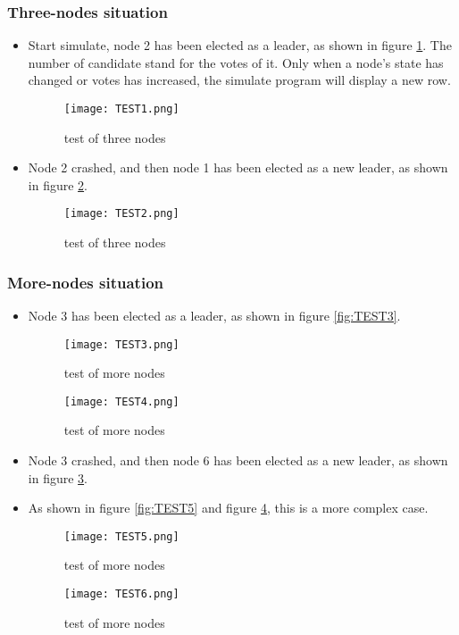 \documentclass{report}
\begin{document}
\subsubsection{Three-nodes situation}
\begin{itemize}
\item Start simulate, node 2 has been elected as a leader, as shown in figure \ref{fig:TEST1}. The number of candidate stand for the votes of it. Only when a node’s state has changed or votes has increased, the simulate program will display a new row.
\begin{figure}[H]
    \centering
    \texttt{[image: TEST1.png]}
    \caption{test of three nodes}
    \label{fig:TEST1}
\end{figure}
\item Node 2 crashed, and then node 1 has been elected as a new leader, as shown in figure \ref{fig:TEST2}.
\begin{figure}[H]
    \centering
    \texttt{[image: TEST2.png]}
    \caption{test of three nodes}
    \label{fig:TEST2}
\end{figure}
\end{itemize}

\subsubsection{More-nodes situation}

\begin{itemize}
\item Node 3 has been elected as a leader, as shown in figure \ref{fig:TEST3}.
\begin{figure}[H]
\begin{minipage}{.45\textwidth}
    \centering
    \texttt{[image: TEST3.png]}
    \caption{test of more nodes}
    \label{fig:TEST3}
\end{minipage}
\begin{minipage}{.45\textwidth}
    \centering
    \texttt{[image: TEST4.png]}
    \caption{test of more nodes}
    \label{fig:TEST4}
\end{minipage}
\end{figure}
\item Node 3 crashed, and then node 6 has been elected as a new leader, as shown in figure \ref{fig:TEST4}.

\item As shown in figure \ref{fig:TEST5} and figure \ref{fig:TEST6}, this is a more complex case. 

\begin{figure}[H]
\begin{minipage}{.45\textwidth}
    \centering
    \texttt{[image: TEST5.png]}
    \caption{test of more nodes}
    \label{fig:TEST5}
\end{minipage}
\begin{minipage}{.45\textwidth}
    \centering
    \texttt{[image: TEST6.png]}
    \caption{test of more nodes}
    \label{fig:TEST6}
\end{minipage}
\end{figure}
\end{itemize}
\end{document}
